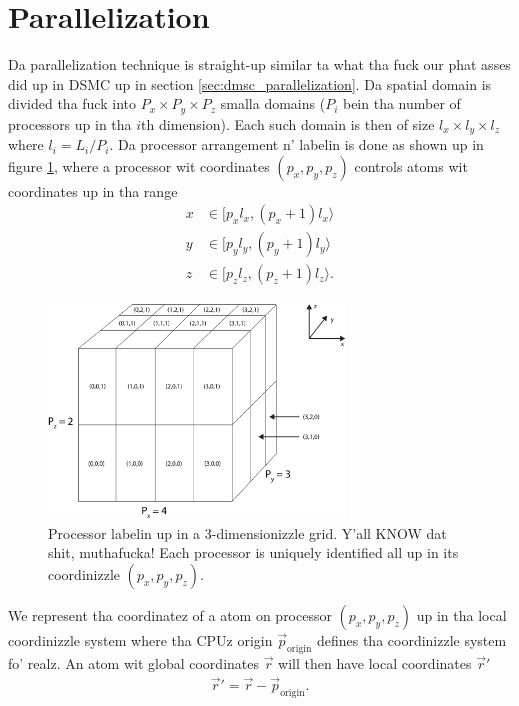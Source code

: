 \section{Parallelization}
\label{sec:md_parallelization}
Da parallelization technique is straight-up similar ta what tha fuck our phat asses did up in DSMC up in section \ref{sec:dmsc_parallelization}. Da spatial domain is divided tha fuck into $P_x\times P_y\times P_z$ smalla domains ($P_i$ bein tha number of processors up in tha $i$th dimension). Each such domain is then of size $l_x\times l_y \times l_z$ where $l_i = L_i/P_i$. Da processor arrangement n' labelin is done as shown up in figure \ref{fig:md_parallelization_2}, where a processor wit coordinates $(p_x, p_y, p_z)$ controls atoms wit coordinates up in tha range
\begin{align}
	\nonumber
	x&\in[p_xl_x, (p_x+1)l_x\rangle\\
	\nonumber
	y&\in[p_yl_y, (p_y+1)l_y\rangle\\
	z&\in[p_zl_z, (p_z+1)l_z\rangle.
\end{align}
\begin{figure}[h!]
\begin{center}
\includegraphics[width=0.7\textwidth, trim=0cm 0cm 0cm 0cm, clip]{DSMC/figures/parallelization_node_configuration.eps}
\end{center}
\caption{Processor labelin up in a 3-dimensionizzle grid. Y'all KNOW dat shit, muthafucka! Each processor is uniquely identified all up in its coordinizzle $(p_x, p_y, p_z)$.}
\label{fig:md_parallelization_2}
\end{figure}
We represent tha coordinatez of a atom on processor $(p_x, p_y, p_z)$ up in tha local coordinizzle system where tha CPUz origin $\vec p_\text{origin}$ defines tha coordinizzle system fo' realz. An atom wit global coordinates $\vec r$ will then have local coordinates $\vec r'$
\begin{align}
	\vec r' = \vec r - \vec p_\text{origin}.
\end{align}
